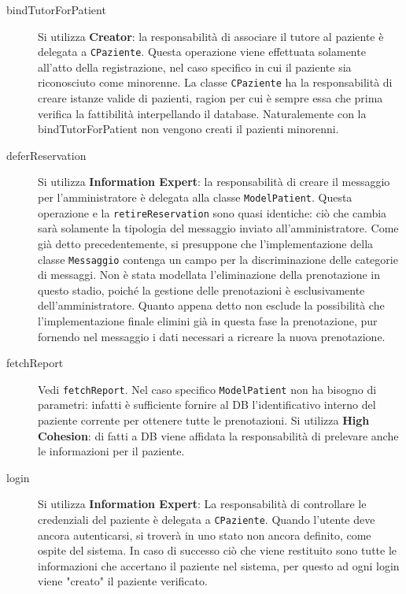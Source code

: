 \begin{description}

\item[bindTutorForPatient]

Si utilizza \textbf{Creator}: la responsabilità di associare il tutore al 
paziente è delegata a \texttt{CPaziente}.
Questa operazione viene effettuata solamente all'atto della registrazione, nel 
caso specifico in cui il paziente sia riconosciuto come minorenne. La classe 
\texttt{CPaziente} ha la responsabilità di creare istanze valide di pazienti, ragion
 per cui è sempre essa che prima verifica la fattibilità interpellando il database.
 Naturalemente con la bindTutorForPatient non vengono creati il pazienti minorenni.
 
\item[deferReservation]

Si utilizza \textbf{Information Expert}: la responsabilità di creare il messaggio 
per l'amministratore è delegata alla classe \texttt{ModelPatient}.
Questa operazione e la \texttt{retireReservation} sono quasi identiche: ciò 
che cambia sarà solamente la tipologia del messaggio inviato all'amministratore.
Come già detto precedentemente, si presuppone che l'implementazione della classe 
\texttt{Messaggio} contenga un campo per la discriminazione delle categorie di messaggi.
Non è stata modellata l'eliminazione della prenotazione  in questo stadio,
poiché la gestione delle prenotazioni è esclusivamente dell'amministratore. Quanto
appena detto non esclude la possibilità che l'implementazione finale elimini già 
in questa fase la prenotazione, pur fornendo nel messaggio i dati necessari a 
ricreare la nuova prenotazione.

\item[fetchReport]

Vedi \texttt{fetchReport}. Nel caso specifico \texttt{ModelPatient} non ha bisogno di 
parametri: infatti è sufficiente fornire al DB l'identificativo interno del 
paziente corrente per ottenere tutte le prenotazioni. Si utilizza \textbf{High Cohesion}: 
di fatti a DB viene affidata la responsabilità di prelevare anche le informazioni per il paziente.

\item[login]

Si utilizza \textbf{Information Expert}: La responsabilità di controllare le 
credenziali del paziente è delegata a \texttt{CPaziente}.
Quando l'utente deve ancora autenticarsi, si troverà in uno stato non ancora 
definito, come ospite del sistema. In caso di successo ciò che viene restituito 
sono tutte le informazioni che accertano il paziente nel sistema, per questo ad 
ogni login viene "creato" il paziente verificato. 



\end{description}
